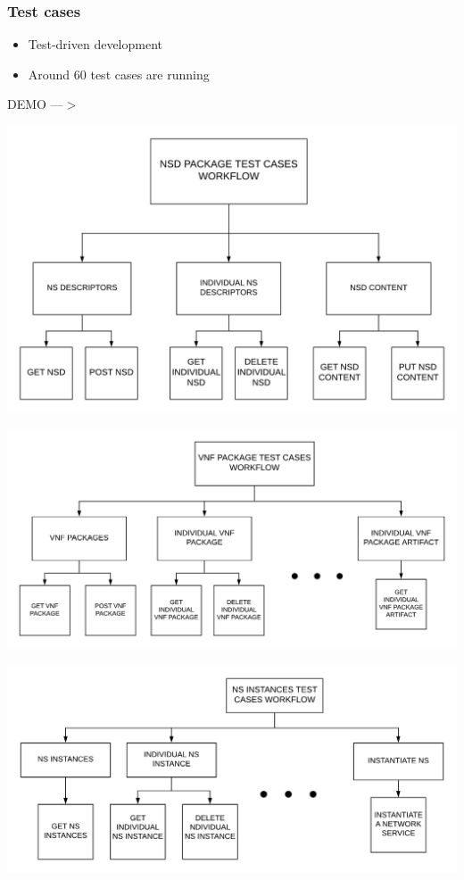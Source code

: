\begin{frame}
\frametitle{Test cases}

\begin{itemize}
	\item Test-driven development
	\item Around 60 test cases are running 
\end{itemize}

\end{frame}
\begin{frame}
\Huge{\centerline{DEMO ---$ > $}}

\end{frame}

\begin{frame}


	\centering
	
	\includegraphics[width=1.0\linewidth]{images/NSD}
\hspace{2cm}

\end{frame}

\begin{frame}
	\centering
	\includegraphics[width=1.0\linewidth]{images/VNF}



\end{frame}

\begin{frame}
	\centering
	\includegraphics[width=1\linewidth ]{images/NSLCM}

\end{frame}



